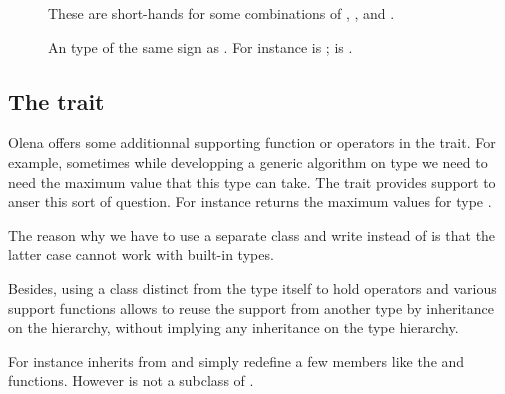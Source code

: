 \begin{description}
\item[]
\item[]
\item[]
\item[]
These are short-hands for some combinations of ,
,  and .

\item[]
An  type of the same sign as .
For instance  is ;  is .



\end{description}

\subsection{The  trait}

Olena offers some additionnal supporting function or operators in the
 trait.  For example, sometimes while developping
a generic algorithm on type  we need to need the maximum value
that this type can take.  The  trait provides
support to anser this sort of question.  For instance
 returns the maximum values for type
.

\begin{OptraitsVersusInnerTypedef}
The reason why we have to use a separate class and write
 instead of  is that
the latter case cannot work with built-in types.

Besides, using a class distinct from the type itself to hold operators
and various support functions allows to reuse the support from another
type by inheritance on the  hierarchy, without implying
any inheritance on the type hierarchy.

For instance  inherits from
 and simply redefine a few members like the
 and  functions.  However
 is not a subclass of .
\end{OptraitsVersusInnerTypedef}

